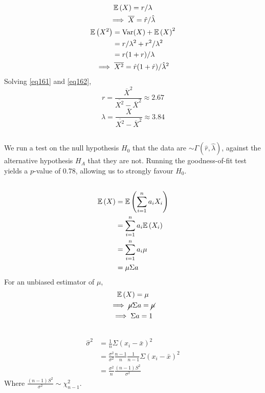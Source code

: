\documentclass[twocolumn]{article}
\numberwithin{equation}{section}
\begin{document}
\subsection{}
\begin{gather}
\mathbb{E}\left(X\right)=r/\lambda\nonumber\\
\implies \overline X=\hat r/\hat \lambda\label{eq161}\\
\begin{aligned}
\mathbb{E}\left(X^2\right)&=\text{Var}(X)+\mathbb{E}\left(X\right)^2\\
&=r/\lambda^2+r^2/\lambda^2\\
&=r(1+r)/\lambda\\
\end{aligned}\nonumber\\
\implies \overline{X^2}=\hat r(1+\hat r)/{\hat{\lambda}}^2\label{eq162}
\end{gather}
Solving \ref{eq161} and \ref{eq162},
\[
r=\frac{\overline{X}^2}{\overline{X^2}-\overline{X}^2}\approx 2.67
\]\[
\lambda=\frac{\overline{X}}{\overline{X^2}-\overline{X}^2}\approx 3.84
\]

\subsection{}
We run a test on the null hypothesis $H_0$ that the data are $\sim\Gamma(\hat r,\hat\lambda)$, against the alternative hypothesis $H_A$ that they are not. Running the goodness-of-fit test yields a $p$-value of 0.78, allowing us to strongly favour $H_0$.

\subsection{}

\begin{align*}
\mathbb{E}\left(X\right)&=\mathbb{E}\left(\sum_{i=1}^n a_iX_i\right)\\
&=\sum_{i=1}^n a_i\mathbb{E}\left(X_i\right)\\
&=\sum_{i=1}^n a_i\mu\\
&=\mu\Sigma a
\end{align*}
For an unbiased estimator of $\mu$,\begin{gather*}
\mathbb{E}\left(X\right)=\mu\\
\implies \cancel{\mu}\Sigma a=\cancel{\mu}\\
\implies \Sigma a=1
\end{gather*}

\subsection{}
\begin{align*}
\hat\sigma^2&=\frac{1}{n}\Sigma(x_i-\bar x)^2\\
&=\frac{\sigma^2}{\sigma^2}\frac{n-1}{n}\frac{1}{n-1}\Sigma(x_i-\bar x)^2\\
&=\frac{\sigma^2}{n}\frac{(n-1)S^2}{\sigma^2}
\end{align*}
Where $\frac{(n-1)S^2}{\sigma^2}\sim\chi_{n-1}^2$.
\end{document}
